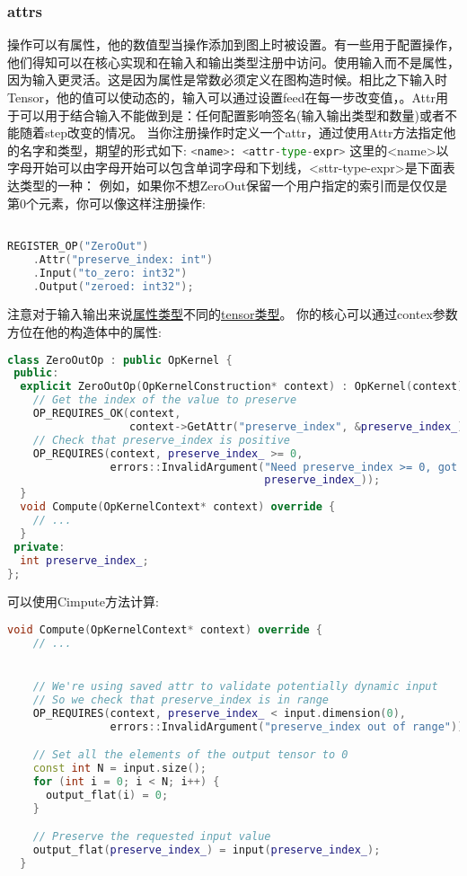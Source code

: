 \subsubsection*{attrs}
操作可以有属性，他的数值型当操作添加到图上时被设置。有一些用于配置操作，他们得知可以在核心实现和在输入和输出类型注册中访问。使用输入而不是属性，因为输入更灵活。这是因为属性是常数必须定义在图构造时候。相比之下输入时Tensor，他的值可以使动态的，输入可以通过设置feed在每一步改变值，。Attr用于可以用于结合输入不能做到是：任何配置影响签名(输入输出类型和数量)或者不能随着step改变的情况。
当你注册操作时定义一个attr，通过使用Attr方法指定他的名字和类型，期望的形式如下:
\lstinline[language=Python]{<name>: <attr-type-expr>}
这里的<name>以字母开始可以由字母开始可以包含单词字母和下划线，<sttr-type-expr>是下面表达类型的一种：
例如，如果你不想ZeroOut保留一个用户指定的索引而是仅仅是第0个元素，你可以像这样注册操作:
\begin{lstlisting}[language=C++]

REGISTER_OP("ZeroOut")
    .Attr("preserve_index: int")
    .Input("to_zero: int32")
    .Output("zeroed: int32");

\end{lstlisting}
注意对于输入输出来说\href{https://www.tensorflow.org/extend/adding_an_op?hl=zh-cn#attr_types}{属性类型}不同的\href{https://www.tensorflow.org/api_docs/python/tf/DType?hl=zh-cn}{tensor类型}。
你的核心可以通过contex参数方位在他的构造体中的属性:
\begin{lstlisting}[language=C++]
class ZeroOutOp : public OpKernel {
 public:
  explicit ZeroOutOp(OpKernelConstruction* context) : OpKernel(context) {
    // Get the index of the value to preserve
    OP_REQUIRES_OK(context,
                   context->GetAttr("preserve_index", &preserve_index_));
    // Check that preserve_index is positive
    OP_REQUIRES(context, preserve_index_ >= 0,
                errors::InvalidArgument("Need preserve_index >= 0, got ",
                                        preserve_index_));
  }
  void Compute(OpKernelContext* context) override {
    // ...
  }
 private:
  int preserve_index_;
};

\end{lstlisting}
可以使用Cimpute方法计算:
\begin{lstlisting}[language=C++]
void Compute(OpKernelContext* context) override {
    // ...


    // We're using saved attr to validate potentially dynamic input
    // So we check that preserve_index is in range
    OP_REQUIRES(context, preserve_index_ < input.dimension(0),
                errors::InvalidArgument("preserve_index out of range"));

    // Set all the elements of the output tensor to 0
    const int N = input.size();
    for (int i = 0; i < N; i++) {
      output_flat(i) = 0;
    }

    // Preserve the requested input value
    output_flat(preserve_index_) = input(preserve_index_);
  }

\end{lstlisting}
